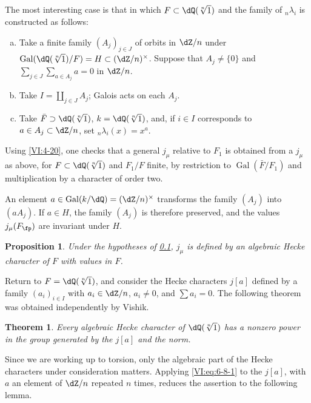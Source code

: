 \documentclass[12pt,oneside,english]{smfbook}
\DeclareMathOperator{\gal}{Gal}
\newcounter{char}
\newtheorem{theorem_}[subsection]{Theorem}
\newtheorem{proposition_}[subsection]{Proposition}
\begin{document}
\subsection{}\label{VI:6-9}

The most interesting case is that in which $F\subset\dQ(\sqrt[n]{1})$ and the family of ${}_n\lambda_i$ is constructed as follows:
\begin{enumerate}[a)]
  \item Take a finite family $(A_j)_{j\in J}$ of orbits in $\dZ/n$ under $\gal(\dQ(\sqrt[n]{1})/F)=H\subset(\dZ/n)^\times$. Suppose that $A_j\ne\{0\}$ and $\sum_{j\in J}\sum_{a\in A_j}a=0$ in $\dZ/n$.
  \item Take $I=\coprod_{j\in J}A_j$; Galois acts on each $A_j$.
  \item Take $\bar F\supset\dQ(\sqrt[n]{1})$, $k=\dQ(\sqrt[n]{1})$, and, if $i\in I$ corresponds to $a\in A_j\subset\dZ/n$, set ${}_n\lambda_i(x)=x^a$.
\end{enumerate}

Using \ref{VI:4-20}, one checks that a general $j_\mu$ relative to $F_1$ is obtained from a $j_\mu$ as above, for $F\subset\dQ(\sqrt[n]{1})$ and $F_1/F$ finite, by restriction to $\gal(\bar F/F_1)$ and multiplication by a character of order two.

An element $a\in\gal(k/\dQ)=(\dZ/n)^\times$ transforms the family $(A_j)$ into $(aA_j)$. If $a\in H$, the family $(A_j)$ is therefore preserved, and the values $j_\mu(F_\fp)$ are invariant under $H$.

\begin{proposition_}\label{VI:6-10}
Under the hypotheses of \ref{VI:6-9}, $j_\mu$ is defined by an algebraic Hecke character of $F$ with values in $F$.
\end{proposition_}

Return to $F=\dQ(\sqrt[n]{1})$, and consider the Hecke characters $j[a]$ defined by a family $(a_i)_{i\in I}$ with $a_i\in\dZ/n$, $a_i\ne0$, and $\sum a_i=0$. The following theorem was obtained independently by Vishik.

\begin{theorem_}\label{VI:6-11}
Every algebraic Hecke character of $\dQ(\sqrt[n]{1})$ has a nonzero power in the group generated by the $j[a]$ and the norm.
\end{theorem_}

Since we are working up to torsion, only the algebraic part of the Hecke characters under consideration matters. Applying \eqref{VI:eq:6-8-1} to the $j[a]$, with $a$ an element of $\dZ/n$ repeated $n$ times, reduces the assertion to the following lemma.
\end{document}
